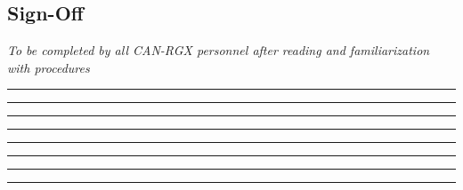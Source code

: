 \subsection{Sign-Off}
\textit{To be completed by all CAN-RGX personnel after reading and familiarization with procedures}
\begin{checklist}
    \item \commanderfull      \tabto{25em}\rule{10em}{0.4pt}\hspace{5em}\rule{10em}{0.4pt}
    \item \payloadfull        \tabto{25em}\rule{10em}{0.4pt}\hspace{5em}\rule{10em}{0.4pt}
    \item \mspecprifull       \tabto{25em}\rule{10em}{0.4pt}\hspace{5em}\rule{10em}{0.4pt}
    \item \mspecsecfull       \tabto{25em}\rule{10em}{0.4pt}\hspace{5em}\rule{10em}{0.4pt}
\end{checklist}
\setcounter{checklistnum}{0}

\newpage
